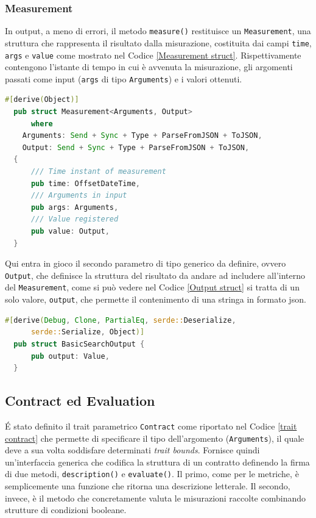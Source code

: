 \subsubsection{Measurement}\label{measurement section}
In output, a meno di errori, il metodo \texttt{measure()} restituisce un \texttt{Measurement}, una struttura che rappresenta il risultato dalla misurazione, costituita dai campi \texttt{time}, \texttt{args} e \texttt{value} come mostrato nel Codice \ref{Measurement struct}.
Rispettivamente contengono l'istante di tempo in cui è avvenuta la misurazione, gli argomenti passati come input (\texttt{args} di tipo \texttt{Arguments}) e i valori ottenuti.

\begin{lstlisting}[language=Rust, caption= Measurement Struct \label{Measurement struct}, basicstyle=\ttfamily ]
  #[derive(Object)]
  pub struct Measurement<Arguments, Output>
      where
    Arguments: Send + Sync + Type + ParseFromJSON + ToJSON,
    Output: Send + Sync + Type + ParseFromJSON + ToJSON,
  {
      /// Time instant of measurement
      pub time: OffsetDateTime,
      /// Arguments in input
      pub args: Arguments,
      /// Value registered
      pub value: Output,
  }
\end{lstlisting}

Qui entra in gioco il secondo parametro di tipo generico da definire, ovvero \texttt{Output}, che definisce la struttura del risultato da andare ad includere all'interno del \texttt{Measurement}, come si può vedere nel Codice \ref{Output struct} si tratta di un solo valore, \texttt{output}, che permette il contenimento di una stringa in formato json.

\begin{lstlisting}[language=Rust, caption= Output Struct \label{Output struct}, basicstyle=\ttfamily ]
  #[derive(Debug, Clone, PartialEq, serde::Deserialize,
      serde::Serialize, Object)]
  pub struct BasicSearchOutput {
      pub output: Value,
  }
\end{lstlisting}

\subsection{Contract ed Evaluation}\label{contract section}
\'E stato definito il trait parametrico \texttt{Contract} come riportato nel Codice \ref{trait contract} che permette di specificare il tipo dell'argomento (\texttt{Arguments}), il quale deve a sua volta soddisfare determinati \textit{trait bounds}. Fornisce quindi un'interfaccia generica che codifica la struttura di un contratto definendo la firma di due metodi, \texttt{description()} e \texttt{evaluate()}. Il primo, come per le metriche, è semplicemente una funzione che ritorna una descrizione letterale. Il secondo, invece, è il metodo che concretamente valuta le misurazioni raccolte combinando strutture di condizioni booleane.

